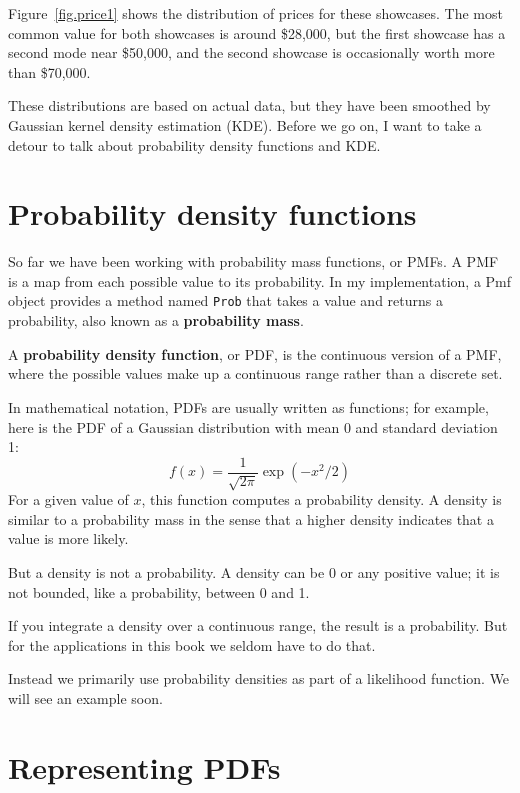 \documentclass[12pt]{book}
\theoremstyle{exercise}
\begin{document}
Figure~\ref{fig.price1} shows the distribution of prices for these
showcases.  The most common value for both showcases is around
\$28,000, but the first showcase has a second mode near \$50,000,
and the second showcase is occasionally worth more than \$70,000.

These distributions are based on actual data, but they
have been smoothed by Gaussian kernel density estimation (KDE).
Before we go on, I want to take a detour to talk about 
probability density functions and KDE.


\section{Probability density functions}

So far we have been working with probability mass functions, or PMFs.
A PMF is a map from each possible value to its probability.  In my
implementation, a Pmf object provides a method named {\tt Prob} that
takes a value and returns a probability, also known as a {\bf probability
mass}.

A {\bf probability density function}, or PDF, is the continuous version of a
PMF, where the possible values make up a continuous range rather than
a discrete set.  

In mathematical notation, PDFs are usually written as functions; for
example, here is the PDF of a Gaussian distribution with
mean 0 and standard deviation 1:
%
\[ f(x) = \frac{1}{\sqrt{2 \pi}} \exp(-x^2/2) \]
%
For a given value of $x$, this function computes a probability
density.  
A density is similar
to a probability mass in the sense that a higher density indicates
that a value is more likely.

But a density is not a probability.  A density can be 0 or any positive
value; it is not bounded, like a probability, between 0 and 1.

If you integrate a density
over a continuous range, the result is a probability.  But 
for the applications in this book we seldom have to do that.

Instead we primarily use probability densities as part
of a likelihood function.  We will see an example soon.


\section{Representing PDFs}
\end{document}
